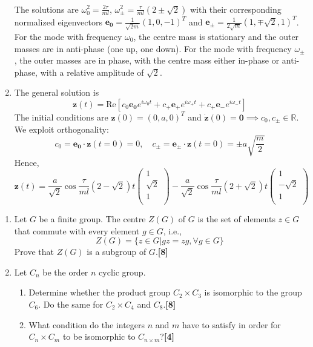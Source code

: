 \documentclass[a4paper]{article}
\begin{document}
\begin{ans}
\begin{enumerate}[label=(\roman*)]
\begin{align}
\end{align}
The solutions are $\omega_0^2=\frac{2\tau}{ml}$, $\omega_\pm^2=\frac{\tau}{ml}(2\pm\sqrt{2})$ with their corresponding normalized eigenvectors $\mathbf{e_0}=\frac{1}{\sqrt{2m}}(1,0,-1)^T$ and $\mathbf{e_\pm}=\frac{1}{2\sqrt{m}}(1,\mp\sqrt{2},1)^T$. For the mode with frequency $\omega_0$, the centre mass is stationary and the outer masses are in anti-phase (one up, one down). For the mode with frequency $\omega_\pm$, the outer masses are in phase, with the centre mass either in-phase or anti-phase, with a relative amplitude of $\sqrt{2}$.
\item The general solution is
$$\mathbf{z}(t)=\text{Re}[c_0\mathbf{e_0}e^{i\omega_0t}+c_+\mathbf{e_+}e^{i\omega_+t}+c_+\mathbf{e_-}e^{i\omega_-t}]$$
The initial conditions are $\mathbf{z}(0)=(0,a,0)^T$ and $\mathbf{\dot{z}}(0)=\boldsymbol{0}\implies c_0,c_\pm\in\mathbb{R}$. We exploit orthogonality:
$$c_0=\mathbf{e_0}\cdot\mathbf{z}(t=0)=0,\quad c_\pm=\mathbf{e_\pm}\cdot\mathbf{z}(t=0)=\pm a\sqrt{\frac{m}{2}}$$
Hence,
$$\mathbf{z}(t)=\frac{a}{\sqrt{2}}\cos\frac{\tau}{ml}(2-\sqrt{2})t\begin{pmatrix}1\\\sqrt{2}\\1\\\end{pmatrix}-\frac{a}{\sqrt{2}}\cos\frac{\tau}{ml}(2+\sqrt{2})t\begin{pmatrix}1\\-\sqrt{2}\\1\\\end{pmatrix}$$
\end{enumerate}
\end{ans}
\begin{qns}\leavevmode
\begin{enumerate}[label=(\roman*)]
\item Let $G$ be a finite group. The centre $Z(G)$ of $G$ is the set of elements $z\in G$ that commute with every element $g\in G$, i.e.,
$$Z(G) = \{z \in G| gz = zg, \forall g \in G\}$$
Prove that $Z(G)$ is a subgroup of $G$.\hfill\textbf{[8]}
\item Let $C_n$ be the order $n$ cyclic group.
\begin{enumerate}[label=(\alph*)]
\item Determine whether the product group $C_2 \times C_3$ is isomorphic to the group $C_6$. Do the same for $C_2 \times C_4$ and $C_8$.\hfill\textbf{[8]}
\item What condition do the integers $n$ and $m$ have to satisfy in order for $C_n\times C_m$ to be isomorphic to $C_{n\times m}$?\hfill\textbf{[4]}
\end{enumerate}
\end{enumerate}
\end{qns}
\end{document}
